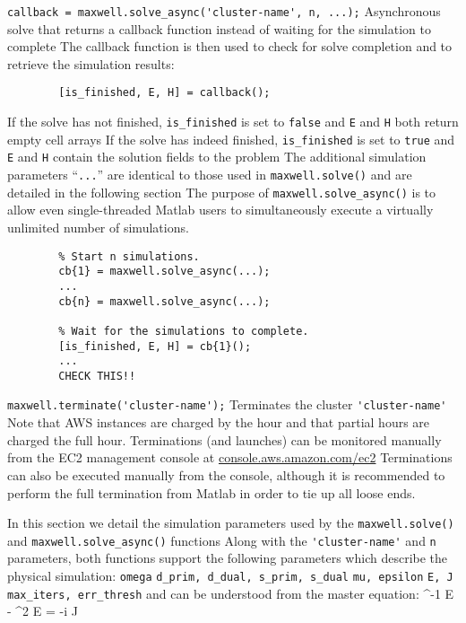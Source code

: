 \documentclass[landscape]{foils}
\renewcommand{\oursection}[1]{
\foilhead[-1.0cm]{#1}
}
\begin{document}
\BIT 
\I  \verb+callback = maxwell.solve_async('cluster-name', n, ...);+
    \BIT
    \I  Asynchronous solve that returns a callback function instead of waiting
        for the simulation to complete 
    \I  The callback function is then used to check for solve completion and 
        to retrieve the simulation results:
        \begin{verbatim}
        [is_finished, E, H] = callback();
        \end{verbatim}
    \I  If the solve has not finished, \verb+is_finished+ is set to \verb+false+ and 
        \verb+E+ and \verb+H+ both return empty cell arrays
    \I  If the solve has indeed finished, \verb+is_finished+ is set to \verb+true+
        and \verb+E+ and \verb+H+ contain the solution fields to the problem
    \I  The additional simulation parameters ``\verb+...+'' are identical to those 
        used in \verb+maxwell.solve()+ and are detailed in the following section
    \EIT
\newpage
\I  The purpose of \verb+maxwell.solve_async()+ is to allow even single-threaded Matlab users 
    to simultaneously execute a virtually unlimited number of simulations.
        \begin{verbatim}
        % Start n simulations.
        cb{1} = maxwell.solve_async(...);
        ...
        cb{n} = maxwell.solve_async(...);

        % Wait for the simulations to complete.
        [is_finished, E, H] = cb{1}();
        ...
        CHECK THIS!!
        \end{verbatim}
\EIT

\newpage
\BIT
\I  \verb+maxwell.terminate('cluster-name');+
    \BIT
    \I  Terminates the cluster \verb+'cluster-name'+
    \I  Note that AWS instances are charged by the hour and that partial hours
        are charged the full hour.
    \EIT
\I  Terminations (and launches) can be monitored manually from the EC2 management
    console at \url{console.aws.amazon.com/ec2}
\I  Terminations can also be executed manually from the console, 
    although it is recommended to perform the full termination from Matlab
    in order to tie up all loose ends.
\EIT

\oursection{How Maxwell solves electromagnetics}
\BIT
\I  In this section we detail the simulation parameters used by the 
    \verb+maxwell.solve()+ and \verb+maxwell.solve_async()+ functions
\I  Along with the \verb+'cluster-name'+ and \verb+n+ parameters, both
    functions support the following parameters which describe the physical simulation:
    \BIT
    \I  \verb+omega+
    \I  \verb+d_prim, d_dual, s_prim, s_dual+
    \I  \verb+mu, epsilon+
    \I  \verb+E, J+
    \I  \verb+max_iters, err_thresh+
    \EIT
    and can be understood from the master equation:
    \BEQ
    \nabla \times \mu^{-1} \nabla \times E - \omega^2 \epsilon E = -i \omega J
    \EEQ
\end{document}

